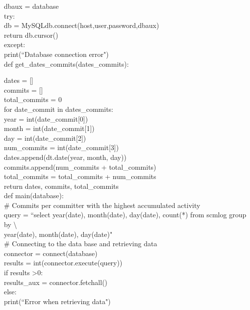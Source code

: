 \documentclass[a4paper, 12pt]{book}
\begin{document}
   \indent dbaux = database\\
   \indent try:\\
   \indent \indent db =  MySQLdb.connect(host,user,password,dbaux)\\
   \indent \indent return db.cursor()\\
   \indent except:\\
   \indent \indent print(``Database connection error")\\

\noindent def get\_dates\_commits(dates\_commits):\bigskip

dates = []\\
  \indent commits = []\\
  \indent total\_commits = 0\\

  \indent for date\_commit in dates\_commits:\\
  \indent \indent year = int(date\_commit[0])\\
  \indent \indent month = int(date\_commit[1])\\
  \indent \indent day = int(date\_commit[2])\\
  \indent \indent num\_commits = int(date\_commit[3])\\
  \indent \indent dates.append(dt.date(year, month, day))\\
  \indent \indent commits.append(num\_commits + total\_commits)\\
  \indent \indent total\_commits = total\_commits + num\_commits\\

  \indent return dates, commits, total\_commits\\

\noindent def main(database):\\

\# Commits per committer with the highest accumulated activity\\
\indent query = ``select year(date), month(date), day(date), count(*) from scmlog group by \textbackslash\\
\indent year(date), month(date), day(date)"\\


\# Connecting to the data base and retrieving data\\
\indent connector = connect(database)\\
\indent results = int(connector.execute(query))\\
\indent if results \textgreater 0:\\
  \indent \indent results\_aux = connector.fetchall()\\
  \indent else:\\  
  \indent \indent print(``Error when retrieving data")\\
\end{document}
